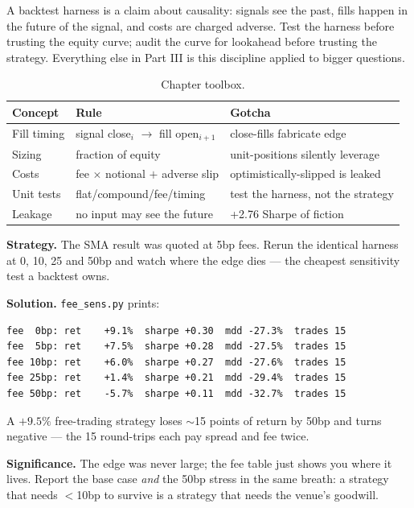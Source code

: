 A backtest harness is a claim about causality: signals see the past, fills happen in the
future of the signal, and costs are charged adverse. Test the harness before trusting the
equity curve; audit the curve for lookahead before trusting the strategy. Everything else
in Part III is this discipline applied to bigger questions.

\begin{table}[htbp]\centering\small
\caption{Chapter toolbox.}
\begin{tabular}{@{}lll@{}}
\toprule
Concept & Rule & Gotcha\\
\midrule
Fill timing & signal close$_i$ $\to$ fill open$_{i+1}$ & close-fills fabricate edge\\
Sizing & fraction of equity & unit-positions silently leverage\\
Costs & fee $\times$ notional $+$ adverse slip & optimistically-slipped is leaked\\
Unit tests & flat/compound/fee/timing & test the harness, not the strategy\\
Leakage & no input may see the future & +2.76 Sharpe of fiction\\
\bottomrule
\end{tabular}
\end{table}

\begin{example}\label{ex:feestress}
\textbf{Strategy.} The SMA result was quoted at 5bp fees. Rerun
the identical harness at 0, 10, 25 and 50bp and watch where the
edge dies --- the cheapest sensitivity test a backtest owns.

\textbf{Solution.} \texttt{fee\_sens.py} prints:
\begin{verbatim}
fee  0bp: ret    +9.1%  sharpe +0.30  mdd -27.3%  trades 15
fee  5bp: ret    +7.5%  sharpe +0.28  mdd -27.5%  trades 15
fee 10bp: ret    +6.0%  sharpe +0.27  mdd -27.6%  trades 15
fee 25bp: ret    +1.4%  sharpe +0.21  mdd -29.4%  trades 15
fee 50bp: ret    -5.7%  sharpe +0.11  mdd -32.7%  trades 15
\end{verbatim}
A $+9.5\%$ free-trading strategy loses $\sim$15 points of return
by 50bp and turns negative --- the 15 round-trips each pay spread
and fee twice.

\textbf{Significance.} The edge was never large; the fee table
just shows you where it lives. Report the base case \emph{and} the
50bp stress in the same breath: a strategy that needs $<$10bp to
survive is a strategy that needs the venue's goodwill.
\end{example}

